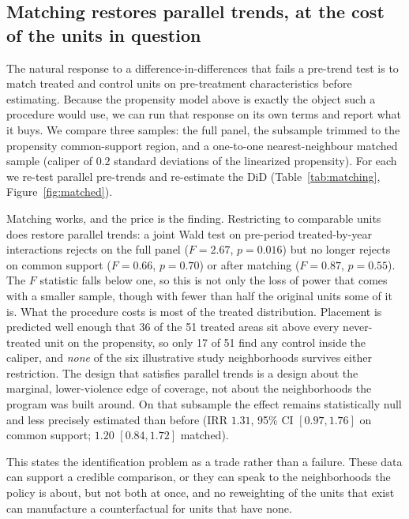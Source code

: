 \documentclass[12pt]{article}
\begin{document}
\subsection{Matching restores parallel trends, at the cost of the units in question}
\label{sec:matching}

The natural response to a difference-in-differences that fails a pre-trend test is to match
treated and control units on pre-treatment characteristics before estimating. Because the
propensity model above is exactly the object such a procedure would use, we can run that
response on its own terms and report what it buys. We compare three samples: the full panel,
the subsample trimmed to the propensity common-support region, and a one-to-one
nearest-neighbour matched sample (caliper of $0.2$ standard deviations of the linearized
propensity). For each we re-test parallel pre-trends and re-estimate the DiD
(Table~\ref{tab:matching}, Figure~\ref{fig:matched}).

Matching works, and the price is the finding. Restricting to comparable units does restore
parallel trends: a joint Wald test on pre-period treated-by-year interactions rejects on the
full panel ($F = 2.67$, $p = 0.016$) but no longer rejects on common support ($F = 0.66$, $p
= 0.70$) or after matching ($F = 0.87$, $p = 0.55$). The $F$ statistic falls below one, so
this is not only the loss of power that comes with a smaller sample, though with fewer than
half the original units some of it is. What the procedure costs is most of the treated
distribution. Placement is predicted well enough that 36 of the 51 treated areas sit above
every never-treated unit on the propensity, so only 17 of 51 find any control inside the
caliper, and \emph{none} of the six illustrative study neighborhoods survives either
restriction. The
design that satisfies parallel trends is a design about the marginal, lower-violence edge of
coverage, not about the neighborhoods the program was built around. On that subsample the
effect remains statistically null and less precisely estimated than before (IRR $1.31$, 95\%
CI $[0.97, 1.76]$ on common support; $1.20$ $[0.84, 1.72]$ matched).

This states the identification problem as a trade rather than a failure. These data can
support a credible comparison, or they can speak to the neighborhoods the policy is about,
but not both at once, and no reweighting of the units that exist can manufacture a
counterfactual for units that have none.
\end{document}
